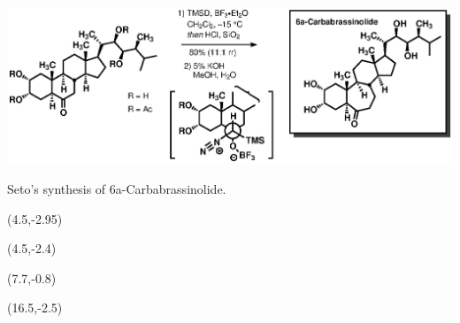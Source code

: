 \begin{Scheme}[t] \centering \includegraphics[scale=0.8]{chp_singlecarbon/images/seto}
  \caption{Seto's synthesis of 6a-Carbabrassinolide.}
  \begin{textblock}{1}(4.5,-2.95)  \end{textblock}
  \begin{textblock}{1}(4.5,-2.4)  \end{textblock}
  \begin{textblock}{1}(7.7,-0.8)  \end{textblock}
  \begin{textblock}{1}(16.5,-2.5)  \end{textblock}
  \label{sch:seto}
\end{Scheme}
